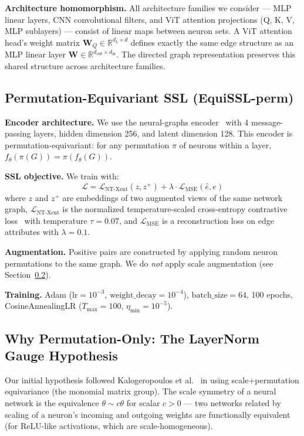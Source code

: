 \textbf{Architecture homomorphism.}
All architecture families we consider ---
MLP linear layers, CNN convolutional filters, and ViT attention projections
(Q, K, V, MLP sublayers) ---
consist of linear maps between neuron sets.
A ViT attention head's weight matrix $\mathbf{W}_Q \in \mathbb{R}^{d_k \times d}$ defines
exactly the same edge structure as an MLP linear layer $\mathbf{W} \in \mathbb{R}^{d_\text{out}
\times d_\text{in}}$.
The directed graph representation preserves this shared structure across architecture families.

\subsection{Permutation-Equivariant SSL (EquiSSL-perm)}

\textbf{Encoder architecture.}
We use the neural-graphs encoder~\cite{Kofinas2024Graph} with 4 message-passing layers,
hidden dimension 256, and latent dimension 128.
This encoder is permutation-equivariant:
for any permutation $\pi$ of neurons within a layer,
$f_\theta(\pi(G)) = \pi(f_\theta(G))$.

\textbf{SSL objective.} We train with:
\begin{equation}
  \mathcal{L} = \mathcal{L}_\text{NT-Xent}(z, z^+) + \lambda \cdot \mathcal{L}_\text{MSE}(\hat{e}, e)
\end{equation}
where $z$ and $z^+$ are embeddings of two augmented views of the same network graph,
$\mathcal{L}_\text{NT-Xent}$ is the normalized temperature-scaled cross-entropy contrastive
loss~\cite{Chen2020Simple} with temperature $\tau = 0.07$,
and $\mathcal{L}_\text{MSE}$ is a reconstruction loss on edge attributes with $\lambda = 0.1$.

\textbf{Augmentation.}
Positive pairs are constructed by applying random neuron permutations to the same graph.
We do \emph{not} apply scale augmentation (see Section~\ref{sec:layernorm}).

\textbf{Training.}
Adam ($\text{lr} = 10^{-3}$, $\text{weight\_decay} = 10^{-4}$),
$\text{batch\_size} = 64$, 100 epochs,
CosineAnnealingLR ($T_\text{max} = 100$, $\eta_\text{min} = 10^{-5}$).

\subsection{Why Permutation-Only: The LayerNorm Gauge Hypothesis}
\label{sec:layernorm}

Our initial hypothesis followed Kalogeropoulos et al.~\cite{Kalogeropoulos2024Scale}
in using scale+permutation equivariance (the monomial matrix group).
The scale symmetry of a neural network is the equivalence $\theta \sim c\theta$ for scalar
$c > 0$ ---
two networks related by scaling of a neuron's incoming and outgoing weights are functionally
equivalent (for ReLU-like activations, which are scale-homogeneous).

